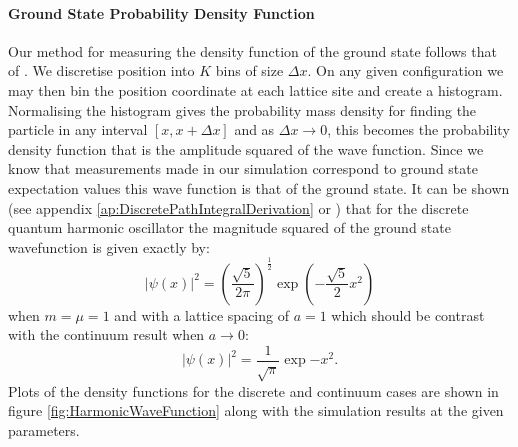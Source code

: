 \documentclass[12pt]{article}
\begin{document}
            \paragraph{Ground State Probability Density Function}
            Our method for measuring the density function of the ground state follows that of \cite{creutz_freedman_1981}. We discretise position into $K$ bins of size $\Delta x$. On any given configuration we may then bin the position coordinate at each lattice site and create a histogram. Normalising the histogram gives the probability mass density for finding the particle in any interval $\left[x,x+\Delta x\right]$ and as $\Delta x \rightarrow 0$, this becomes the probability density function that is the amplitude squared of the wave function. Since we know that measurements made in our simulation correspond to ground state expectation values this wave function is that of the ground state. It can be shown (see appendix \ref{ap:DiscretePathIntegralDerivation} or \cite{creutz_freedman_1981}) that for the discrete quantum harmonic oscillator the magnitude squared of the ground state wavefunction is given exactly by:
            \begin{equation}
                \label{eq:magSquaredWavefunction}
                |\psi\left(x\right)|^2=\left(\frac{\sqrt{5}}{2\pi}\right)^\frac{1}{2}\exp\left(-\frac{\sqrt{5}}{2}x^2\right)
            \end{equation}
            when $m=\mu=1$ and with a lattice spacing of $a=1$ which should be contrast with the continuum result when $a\rightarrow 0$:
            \begin{equation}
            |\psi\left(x\right)|^2 = \frac{1}{\sqrt{\pi}}\exp{-x^2}.
            \end{equation}
            Plots of the density functions for the discrete and continuum cases are shown in figure \ref{fig:HarmonicWaveFunction} along with the simulation results at the given parameters.
\end{document}
